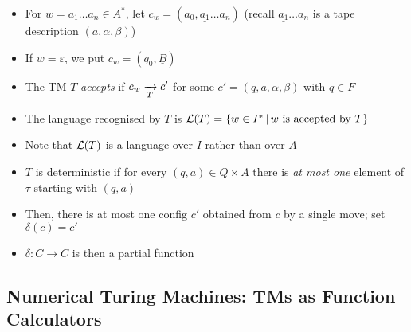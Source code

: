 \begin{itemize}
	
	\item For $ w = a_1 \dots a_n \in A^* $, let $ c_w = (a_0, \underline{a_1} \dots a_n) $ (recall $ \underline{a_1} \dots a_n $ is a tape description $ (a, \alpha, \beta) $)
	
	\item If $ w = \varepsilon $, we put $ c_w = (q_0, \underline{B}) $
	
	\item The TM $ T $ \textit{accepts} if $ c_w \xrightarrow[T]{} c' $ for some $ c' = (q, a, \alpha, \beta) $ with $ q \in F $
	
	\item The language recognised by $ T $ is $ \mathcal{L}(T) = \left\lbrace w \in I^* \, | \, w \text{ is accepted by } T  \right\rbrace $
	
	\item Note that $ \mathcal{L}(T) $ is a language over $ I $ rather than over $ A $
	
	\item $ T $ is deterministic if for every $ (q, a) \in Q \times A $ there is \textit{at most one} element of $ \tau $ starting with $ (q, a) $
	
	\item Then, there is at most one config $ c' $ obtained from $ c $ by a single move; set $ \delta(c) = c' $
	
	\item $ \delta: C \to C $ is then a partial function
	
\end{itemize}

\clearpage

\subsection{Numerical Turing Machines: TMs as Function Calculators}

